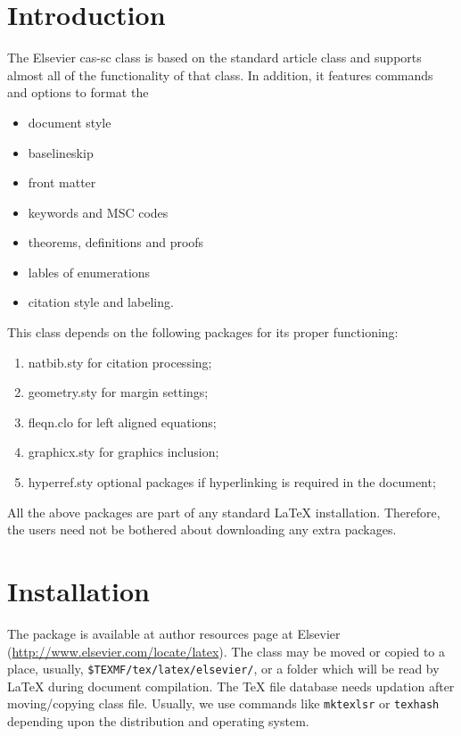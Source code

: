 \documentclass[a4paper,fleqn]{cas-sc}
\begin{document}
\maketitle


\section{Introduction}

The Elsevier cas-sc class is based on the
standard article class and supports almost all of the functionality of
that class. In addition, it features commands and options to format the
\begin{itemize} \item document style \item baselineskip \item front
matter \item keywords and MSC codes \item theorems, definitions and
proofs \item lables of enumerations \item citation style and labeling.
\end{itemize}

This class depends on the following packages
for its proper functioning:

\begin{enumerate}
\itemsep=0pt
\item {natbib.sty} for citation processing;
\item {geometry.sty} for margin settings;
\item {fleqn.clo} for left aligned equations;
\item {graphicx.sty} for graphics inclusion;
\item {hyperref.sty} optional packages if hyperlinking is
  required in the document;
\end{enumerate}

All the above packages are part of any
standard \LaTeX{} installation.
Therefore, the users need not be
bothered about downloading any extra packages.

\section{Installation}

The package is available at author resources page at Elsevier
(\url{http://www.elsevier.com/locate/latex}).
The class may be moved or copied to a place, usually,
\verb+$TEXMF/tex/latex/elsevier/+, %
or a folder which will be read
by \LaTeX{} during document compilation.  The \TeX{} file
database needs updation after moving/copying class file.  Usually,
we use commands like \verb+mktexlsr+ or \verb+texhash+ depending
upon the distribution and operating system.
\end{document}
